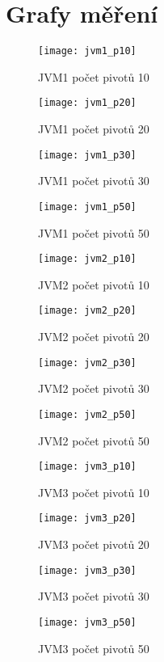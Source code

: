 \chapter{Grafy měření\label{ape:graphs}}
\begin{figure}[h]
\centering
\texttt{[image: jvm1\_p10]}
\caption{JVM1 počet pivotů 10\label{fig:jvm1p10}}
\end{figure}
\begin{figure}[h]
\texttt{[image: jvm1\_p20]}
\caption{JVM1 počet pivotů 20\label{fig:jvm1p20}}
\end{figure}

\begin{figure}[h]
\centering
\texttt{[image: jvm1\_p30]}
\caption{JVM1 počet pivotů 30\label{fig:jvm1p30}}
\end{figure}
\begin{figure}[h]
\centering
\texttt{[image: jvm1\_p50]}
\caption{JVM1 počet pivotů 50\label{fig:jvm1p50}}
\end{figure}

\begin{figure}[h]
\centering
\texttt{[image: jvm2\_p10]}
\caption{JVM2 počet pivotů 10\label{fig:jvm2p10}}
\end{figure}

\begin{figure}[h]
\centering
\texttt{[image: jvm2\_p20]}
\caption{JVM2 počet pivotů 20\label{fig:jvm2p20}}
\end{figure}
\begin{figure}[h]
\centering
\texttt{[image: jvm2\_p30]}
\caption{JVM2 počet pivotů 30\label{fig:jvm2p30}}
\end{figure}
\begin{figure}[h]
\centering
\texttt{[image: jvm2\_p50]}
\caption{JVM2 počet pivotů 50\label{fig:jvm2p50}}
\end{figure}

\begin{figure}[h]
\centering
\texttt{[image: jvm3\_p10]}
\caption{JVM3 počet pivotů 10\label{fig:jvm3p10}}
\end{figure}
\begin{figure}[h]
\centering
\texttt{[image: jvm3\_p20]}
\caption{JVM3 počet pivotů 20\label{fig:jvm3p20}}
\end{figure}

\begin{figure}[h]
\centering
\texttt{[image: jvm3\_p30]}
\caption{JVM3 počet pivotů 30\label{fig:jvm3p30}}
\end{figure}
\begin{figure}[h]
\centering
\texttt{[image: jvm3\_p50]}
\caption{JVM3 počet pivotů 50\label{fig:jvm3p50}}
\end{figure}

